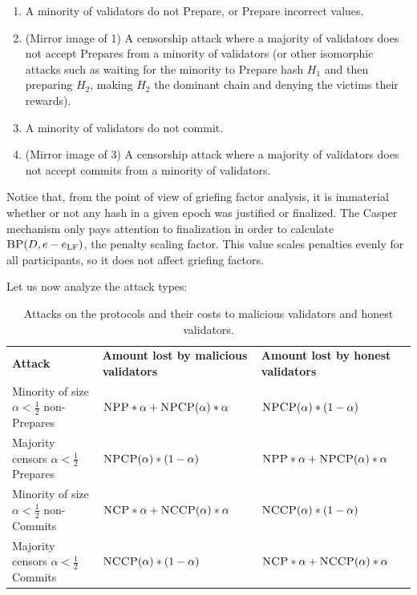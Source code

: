 \documentclass[12pt, final]{article}
\newcommand{\epoch}{\ensuremath{e}\space}
\newcommand{\epochLF}{\ensuremath{\epoch_{\textnormal{LF}}}\space}
\newcommand{\BP}{\textsc{BP}\space}
\newcommand{\NCP}{\textsc{NCP}\space}
\newcommand{\NCCP}{\textsc{NCCP}\space}
\newcommand{\NPP}{\textsc{NPP}\space}
\newcommand{\NPCP}{\textsc{NPCP}\space}
\begin{document}
\begin{enumerate}
\item A minority of validators do not Prepare, or Prepare incorrect values.
\item (Mirror image of 1) A censorship attack where a majority of validators does not accept Prepares from a minority of validators (or other isomorphic attacks such as waiting for the minority to Prepare hash $H_1$ and then preparing $H_2$, making $H_2$ the dominant chain and denying the victims their rewards).
\item A minority of validators do not commit.
\item (Mirror image of 3) A censorship attack where a majority of validators does not accept commits from a minority of validators.
\end{enumerate}

Notice that, from the point of view of griefing factor analysis, it is immaterial whether or not any hash in a given epoch was justified or finalized. The Casper mechanism only pays attention to finalization in order to calculate $\BP(D, \epoch - \epochLF)$, the penalty scaling factor. This value scales penalties evenly for all participants, so it does not affect griefing factors.

Let us now analyze the attack types:



\begin{table}
\centering
    \renewcommand{\arraystretch}{2}
    \begin{tabular}{l l l }
    \textbf{Attack} & \textbf{Amount lost by malicious validators}  & \textbf{Amount lost by honest validators} \\
    Minority of size $\alpha < \frac{1}{2}$ non-Prepares & $\NPP * \alpha + \NPCP(\alpha) * \alpha$ & $\NPCP(\alpha) * (1-\alpha)$ \\
    Majority censors $\alpha < \frac{1}{2}$ Prepares & $\NPCP(\alpha) * (1-\alpha)$ & $\NPP * \alpha + \NPCP(\alpha) * \alpha$ \\
    Minority of size $\alpha < \frac{1}{2}$ non-Commits & $\NCP * \alpha + \NCCP(\alpha) * \alpha$ & $\NCCP(\alpha) * (1-\alpha)$ \\
    Majority censors $\alpha < \frac{1}{2}$ Commits & $\NCCP(\alpha) * (1-\alpha)$ & $\NCP * \alpha + \NCCP(\alpha) * \alpha$ \\
    \end{tabular}
    \caption{Attacks on the protocols and their costs to malicious validators and honest validators.}
\end{table}
\end{document}
